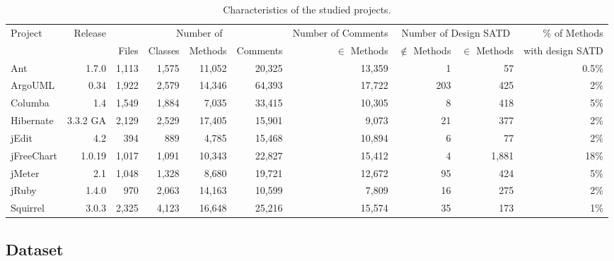\begin{landscape}
\begin{table}[t]
	\caption{Characteristics of the studied projects.}
	\label{tab:projects}
	\centering
		\begin{adjustbox}{center}
			\begin{tabular}{l r | r r r r | r | r r | r}
				\hline
				\multirow{2}{*}{Project} & \multirow{2}{*}{Release} &\multicolumn{4}{c|}{Number of} &\multicolumn{1}{c|}{Number of Comments}
				&\multicolumn{2}{c|}{Number of Design SATD} & \% of Methods\\
				&& Files& Classes& Methods& Comments                      & $\in$ Methods& $\notin$ Methods & $\in$ Methods & with design SATD\\
				\hline
				Ant&1.7.0 & 1,113 & 1,575 & 11,052 & 20,325               & 13,359        &  1 & 57 & 0.5\% \\
				ArgoUML&0.34& 1,922 & 2,579 & 14,346 & 64,393       &  17,722       & 203 & 425  & 2\%\\
				Columba&1.4& 1,549 & 1,884 & 7,035 & 33,415           & 10,305        & 8 & 418 & 5\%  \\
				Hibernate&3.3.2 GA & 2,129 & 2,529 & 17,405 & 15,901 & 9,073        & 21  &  377  &  2\%\\
				jEdit & 4.2 & 394 & 889 & 4,785 & 15,468                     &10,894         & 6  & 77  & 2\% \\
				jFreeChart&1.0.19 & 1,017 & 1,091 & 10,343 & 22,827  & 15,412       &  4  & 1,881  & 18\%\\
				jMeter&2.1& 1,048 & 1,328 & 8,680 & 19,721                &  12,672      & 95 &  424 & 5\%  \\
				jRuby&1.4.0 & 970 & 2,063 & 14,163 & 10,599               & 7,809        & 16   & 275  &  2\%\\
				Squirrel&3.0.3 & 2,325 & 4,123 & 16,648 & 25,216         & 15,574      &35  & 173  & 1\%\\
				\hline
			\end{tabular}
		\end{adjustbox}
		\vspace{-4mm}
\end{table}
\end{landscape}

\subsection{Dataset}


